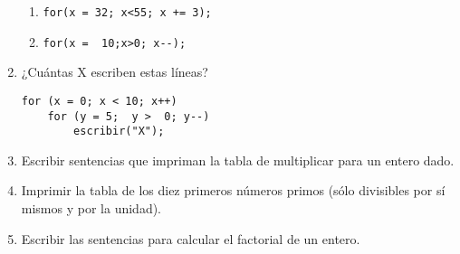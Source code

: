 \begin{enumerate}
\begin{enumerate}[label=\alph*.]
	\item 
\begin{lstlisting}
for(x = 32; x<55; x += 3);
\end{lstlisting}

	\item 
\begin{lstlisting}
for(x =  10;x>0; x--);
\end{lstlisting}
\end{enumerate}
\item ¿Cuántas X escriben estas líneas?
\begin{lstlisting}
for (x = 0; x < 10; x++)
    for (y = 5;  y >  0; y--)
        escribir("X");
\end{lstlisting}
\item Escribir sentencias que impriman la tabla de multiplicar para un entero
dado.
\item Imprimir la tabla de los diez primeros números primos (sólo divisibles por
sí mismos y por la unidad).
\item Escribir las sentencias para calcular el factorial de un entero.
\end{enumerate}

